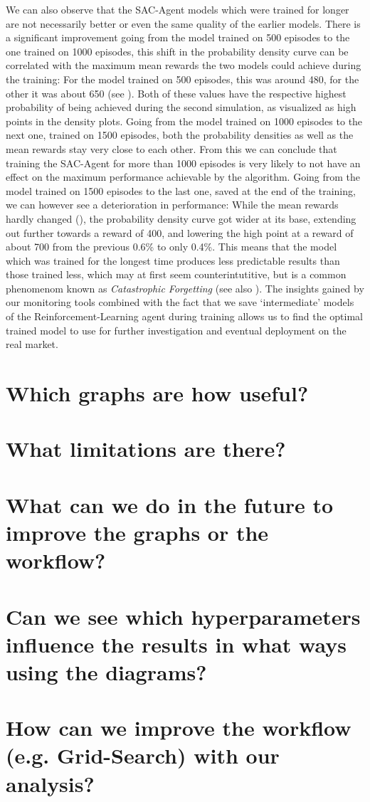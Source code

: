 We can also observe that the SAC-Agent models which were trained for longer are not necessarily better or even the same quality of the earlier models. There is a significant improvement going from the model trained on 500 episodes to the one trained on 1000 episodes, this shift in the probability density curve can be correlated with the maximum mean rewards the two models could achieve during the training: For the model trained on 500 episodes, this was around 480, for the other it was about 650 (see ). Both of these values have the respective highest probability of being achieved during the second simulation, as visualized as high points in the density plots. Going from the model trained on 1000 episodes to the next one, trained on 1500 episodes, both the probability densities as well as the mean rewards stay very close to each other. From this we can conclude that training the SAC-Agent for more than 1000 episodes is very likely to not have an effect on the maximum performance achievable by the algorithm. Going from the model trained on 1500 episodes to the last one, saved at the end of the training, we can however see a deterioration in performance: While the mean rewards hardly changed (), the probability density curve got wider at its base, extending out further towards a reward of 400, and lowering the high point at a reward of about 700 from the previous 0.6\% to only 0.4\%. This means that the model which was trained for the longest time produces less predictable results than those trained less, which may at first seem counterintutitive, but is a common phenomenom known as \emph{Catastrophic Forgetting} (see also \cite{CatastrophicForgetting}). The insights gained by our monitoring tools combined with the fact that we save `intermediate' models of the Reinforcement-Learning agent during training allows us to find the optimal trained model to use for further investigation and eventual deployment on the real market.

\section*{Which graphs are how useful?}
\section*{What limitations are there?}
\section*{What can we do in the future to improve the graphs or the workflow?}
\section*{Can we see which hyperparameters influence the results in what ways using the diagrams?}
\section*{How can we improve the workflow (e.g. Grid-Search) with our analysis?}

